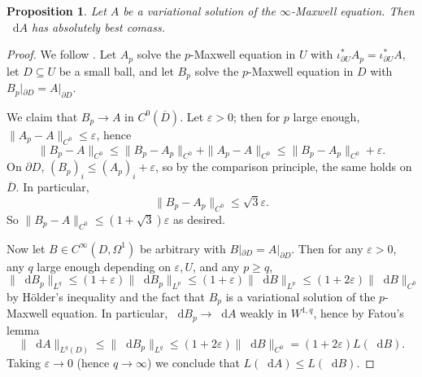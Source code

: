 \documentclass[reqno,11pt]{amsart}
\newcommand*\dif{\mathop{}\!\mathrm{d}}
\newtheorem{proposition}[theorem]{Proposition}
\theoremstyle{definition}
\numberwithin{equation}{section}
\begin{document}
\begin{proposition}
Let $A$ be a variational solution of the $\infty$-Maxwell equation.
Then $\dif A$ has absolutely best comass.
\end{proposition}
\begin{proof}
We follow \cite[Theorem 5]{lindqvist2015notes}.
Let $A_p$ solve the $p$-Maxwell equation in $U$ with $\iota_{\partial U}^* A_p = \iota^*_{\partial U} A$, let $D \subseteq U$ be a small ball, and let $B_p$ solve the $p$-Maxwell equation in $D$ with $B_p|_{\partial D} = A|_{\partial D}$.

We claim that $B_p \to A$ in $C^0(\overline D)$.
Let $\varepsilon > 0$; then for $p$ large enough, $\|A_p - A\|_{C^0} \leq \varepsilon$, hence
$$\|B_p - A\|_{C^0} \leq \|B_p - A_p\|_{C^0} + \|A_p - A\|_{C^0} \leq \|B_p - A_p\|_{C^0} + \varepsilon.$$
On $\partial D$, $(B_p)_i \leq (A_p)_i + \varepsilon$, so by the comparison principle, the same holds on $\overline D$.
In particular, 
$$\|B_p - A_p\|_{C^0} \leq \sqrt 3 \varepsilon.$$
So $\|B_p - A\|_{C^0} \leq (1 + \sqrt 3) \varepsilon$ as desired.

Now let $B \in C^\infty(D, \Omega^1)$ be arbitrary with $B|_{\partial D} = A|_{\partial D}$.
Then for any $\varepsilon > 0$, any $q$ large enough depending on $\varepsilon, U$, and any $p \geq q$,
$$\|\dif B_p\|_{L^q} \leq (1 + \varepsilon) \|\dif B_p\|_{L^p} \leq (1 + \varepsilon) \|\dif B\|_{L^p} \leq (1 + 2\varepsilon) \|\dif B\|_{C^0}$$
by H\"older's inequality and the fact that $B_p$ is a variational solution of the $p$-Maxwell equation.
In particular, $\dif B_p \to \dif A$ weakly in $W^{1, q}$, hence by Fatou's lemma
$$\|\dif A\|_{L^q(D)} \leq \|\dif B_p\|_{L^q} \leq (1 + 2\varepsilon) \|\dif B\|_{C^0} = (1 + 2\varepsilon) L(\dif B).$$
Taking $\varepsilon \to 0$ (hence $q \to \infty$) we conclude that $L(\dif A) \leq L(\dif B)$.
\end{proof}

\printbibliography
\end{document}
